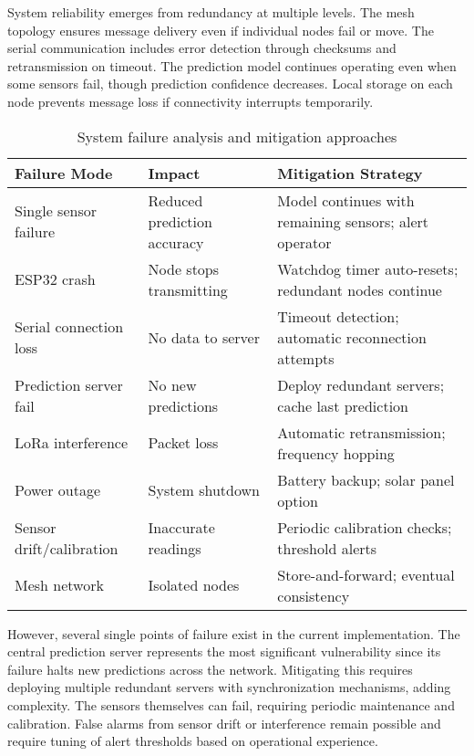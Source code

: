 System reliability emerges from redundancy at multiple levels. The mesh topology ensures message delivery even if individual nodes fail or move. The serial communication includes error detection through checksums and retransmission on timeout. The prediction model continues operating even when some sensors fail, though prediction confidence decreases. Local storage on each node prevents message loss if connectivity interrupts temporarily.

\begin{table}[H]
\centering
\caption{System failure analysis and mitigation approaches}
\label{tab:failure_modes}
\begin{tabular}{|p{3.5cm}|p{4cm}|p{7cm}|}
\hline
\textbf{Failure Mode} & \textbf{Impact} & \textbf{Mitigation Strategy} \\
\hline
Single sensor failure & Reduced prediction accuracy & Model continues with remaining sensors; alert operator \\
\hline
ESP32 crash & Node stops transmitting & Watchdog timer auto-resets; redundant nodes continue \\
\hline
Serial connection loss & No data to server & Timeout detection; automatic reconnection attempts \\
\hline
Prediction server fail & No new predictions & Deploy redundant servers; cache last prediction \\
\hline
LoRa interference & Packet loss & Automatic retransmission; frequency hopping \\
\hline
Power outage & System shutdown & Battery backup; solar panel option \\
\hline
Sensor drift/calibration & Inaccurate readings & Periodic calibration checks; threshold alerts \\
\hline
Mesh network  & Isolated nodes & Store-and-forward; eventual consistency \\
\hline
\end{tabular}
\end{table}

However, several single points of failure exist in the current implementation. The central prediction server represents the most significant vulnerability since its failure halts new predictions across the network. Mitigating this requires deploying multiple redundant servers with synchronization mechanisms, adding complexity. The sensors themselves can fail, requiring periodic maintenance and calibration. False alarms from sensor drift or interference remain possible and require tuning of alert thresholds based on operational experience.

